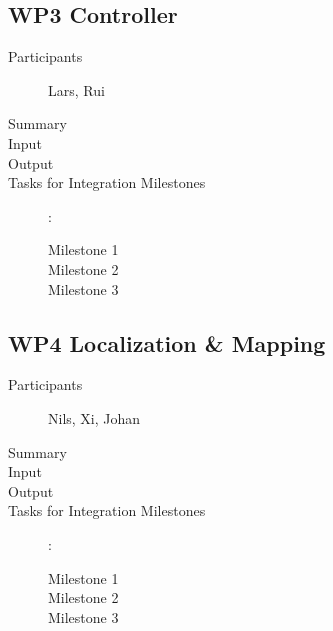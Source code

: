 \documentclass[11pt,a4paper]{article}
\begin{document}
\subsection{WP3 Controller}

\begin{description}
\item[Participants] Lars, Rui
\item[Summary]
\item[Input]
\item[Output]
\item[Tasks for Integration Milestones]:\
	\begin{description}
		\item[Milestone 1]
		\item[Milestone 2]
		\item[Milestone 3] 
	\end{description}	 
\end{description}

\subsection{WP4 Localization \& Mapping}

\begin{description}
\item[Participants] Nils, Xi, Johan
\item[Summary]
\item[Input]
\item[Output]
\item[Tasks for Integration Milestones]:\
	\begin{description}
		\item[Milestone 1]
		\item[Milestone 2]
		\item[Milestone 3] 
	\end{description}	 
\end{description}
\end{document}
